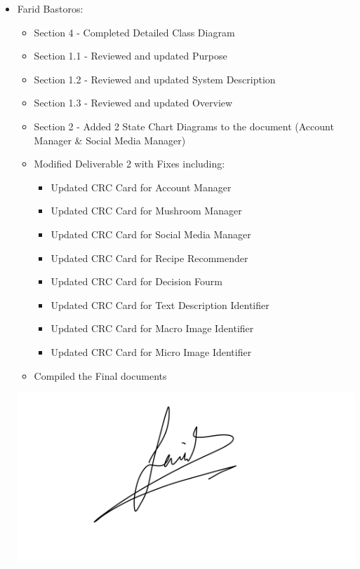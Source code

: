 \documentclass[]{article}
\begin{document}
\begin{itemize}
	\item Farid Bastoros:
	\begin{itemize} 
		\item Section 4 - Completed Detailed Class Diagram
		\item Section 1.1 - Reviewed and updated Purpose
		\item Section 1.2 - Reviewed and updated System Description
		\item Section 1.3 - Reviewed and updated Overview
		\item Section 2 - Added 2 State Chart Diagrams to the document (Account Manager \& Social Media Manager)
		\item Modified Deliverable 2 with Fixes including:
		\begin{itemize} 
			\item Updated CRC Card for Account Manager
			\item Updated CRC Card for Mushroom Manager
			\item Updated CRC Card for Social Media Manager
			\item Updated CRC Card for Recipe Recommender
			\item Updated CRC Card for Decision Fourm
			\item Updated CRC Card for Text Description Identifier
			\item Updated CRC Card for Macro Image Identifier
			\item Updated CRC Card for Micro Image Identifier
		\end{itemize}	
		\item Compiled the Final documents
	\end{itemize}
	\includegraphics[scale=0.09]{Farid Bastoros - Signature.jpeg}

\end{itemize}
\end{document}
